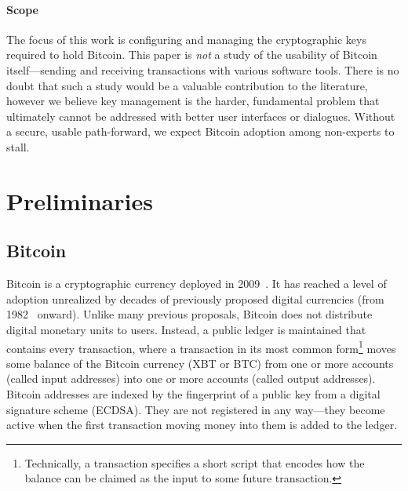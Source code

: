 \paragraph{Scope}

The focus of this work is configuring and managing the cryptographic keys required to hold Bitcoin. This paper is \emph{not} a study of the usability of Bitcoin itself---\eg sending and receiving transactions with various software tools. There is no doubt that such a study would be a valuable contribution to the literature, however we believe key management is the harder, fundamental problem that ultimately cannot be addressed with better user interfaces or dialogues. Without a secure, usable path-forward, we expect Bitcoin adoption among non-experts to stall.



\section{Preliminaries}

\subsection{Bitcoin}

Bitcoin is a cryptographic currency deployed in 2009~\cite{Nak08}. It has reached a level of adoption unrealized by decades of previously proposed digital currencies (from 1982~\cite{Cha82} onward). Unlike many previous proposals, Bitcoin does not distribute digital monetary units to users. Instead, a public ledger is maintained that contains every transaction, where a transaction in its most common form\footnote{Technically, a transaction specifies a short script that encodes how the balance can be claimed as the input to some future transaction.} moves some balance of the Bitcoin currency (XBT or BTC) from one or more accounts (called input addresses) into one or more accounts (called output addresses). Bitcoin addresses are indexed by the fingerprint of a public key from a digital signature scheme (ECDSA). They are not registered in any way---they become active when the first transaction moving money into them is added to the ledger. 

